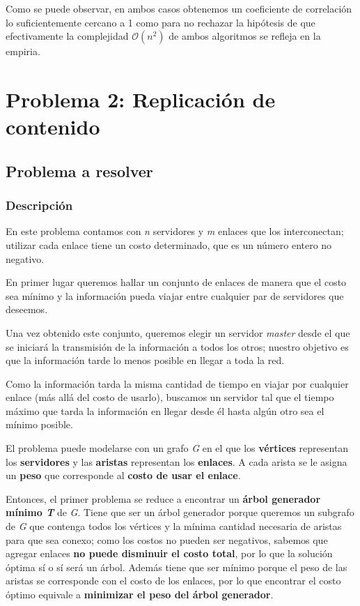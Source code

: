 \documentclass[a4paper]{report}
\begin{document}
Como se puede observar, en ambos casos obtenemos un coeficiente de correlación lo suficientemente cercano a 1 como para no rechazar la hipótesis de que efectivamente la complejidad $\mathcal{O}(n^2)$ de ambos algoritmos se refleja en la empiria.

\chapter{Problema 2: Replicación de contenido}

\section{Problema a resolver}

\subsection{Descripción}

En este problema contamos con \textit{n} servidores y \textit{m} enlaces que los interconectan; utilizar cada enlace tiene un costo determinado, que es un número entero no negativo. 

En primer lugar queremos hallar un conjunto de enlaces de manera que el costo sea mínimo y la información pueda viajar entre cualquier par de servidores que deseemos. 

Una vez obtenido este conjunto, queremos elegir un servidor \textit{master} desde el que se iniciará la transmisión de la información a todos los otros; nuestro objetivo es que la información tarde lo menos posible en llegar a toda la red. 

Como la información tarda la misma cantidad de tiempo en viajar por cualquier enlace (más allá del costo de usarlo), buscamos un servidor tal que el tiempo máximo que tarda la información en llegar desde él hasta algún otro sea el mínimo posible. 

El problema puede modelarse con un grafo \textit{G} en el que los \textbf{vértices} representan los \textbf{servidores} y las \textbf{aristas} representan los \textbf{enlaces}. A cada arista se le asigna un \textbf{peso} que corresponde al \textbf{costo de usar el enlace}.

Entonces, el primer problema se reduce a encontrar un \textbf{árbol generador mínimo \textit{T}} de \textit{G}. Tiene que ser un árbol generador porque queremos un subgrafo de \textit{G} que contenga todos los vértices y la mínima cantidad necesaria de aristas para que sea conexo; como los costos no pueden ser negativos, sabemos que agregar enlaces \textbf{no puede disminuir el costo total}, por lo que la solución óptima sí o sí será un árbol. Además tiene que ser mínimo porque el peso de las aristas se corresponde con el costo de los enlaces, por lo que encontrar el costo óptimo equivale a \textbf{minimizar el peso del árbol generador}.
\end{document}
